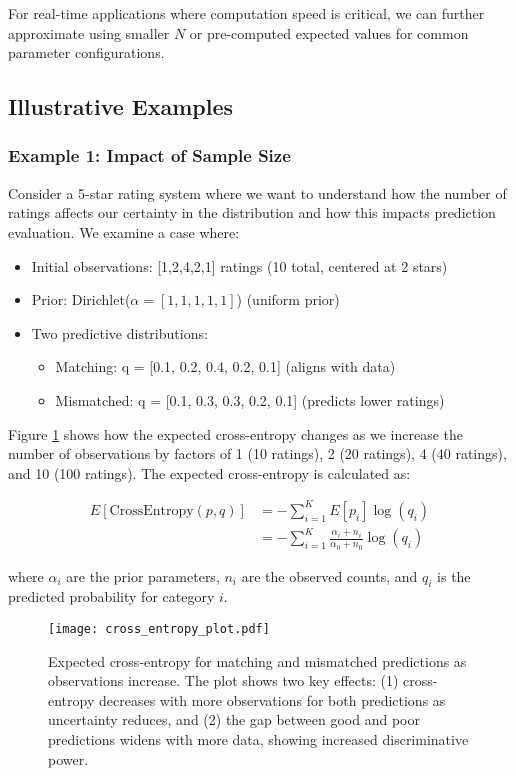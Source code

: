 \documentclass[journal]{IEEEtran}
\begin{document}
For real-time applications where computation speed is critical, we can further approximate using smaller $N$ or pre-computed expected values for common parameter configurations.

\subsection{Illustrative Examples}

\subsubsection{Example 1: Impact of Sample Size}
Consider a 5-star rating system where we want to understand how the number of ratings affects our certainty in the distribution and how this impacts prediction evaluation. We examine a case where:

\begin{itemize}
\item Initial observations: [1,2,4,2,1] ratings (10 total, centered at 2 stars)
\item Prior: Dirichlet($\alpha = [1,1,1,1,1]$) (uniform prior)
\item Two predictive distributions:
  \begin{itemize}
    \item Matching: q = [0.1, 0.2, 0.4, 0.2, 0.1] (aligns with data)
    \item Mismatched: q = [0.1, 0.3, 0.3, 0.2, 0.1] (predicts lower ratings)
  \end{itemize}
\end{itemize}

Figure \ref{fig:cross_entropy} shows how the expected cross-entropy changes as we increase the number of observations by factors of 1 (10 ratings), 2 (20 ratings), 4 (40 ratings), and 10 (100 ratings). The expected cross-entropy is calculated as:

\begin{equation}
\begin{split}
E[\text{CrossEntropy}(p,q)] & = -\sum_{i=1}^K E[p_i]\log(q_i) \\
 & = -\sum_{i=1}^K \frac{\alpha_i + n_i}{\alpha_0 + n_0}\log(q_i)
\end{split}
\end{equation}

where $\alpha_i$ are the prior parameters, $n_i$ are the observed counts, and $q_i$ is the predicted probability for category $i$.

\begin{figure}[t]
\centering
\texttt{[image: cross\_entropy\_plot.pdf]}
\caption{Expected cross-entropy for matching and mismatched predictions as observations increase. The plot shows two key effects: (1) cross-entropy decreases with more observations for both predictions as uncertainty reduces, and (2) the gap between good and poor predictions widens with more data, showing increased discriminative power.}
\label{fig:cross_entropy}
\end{figure}
\end{document}
